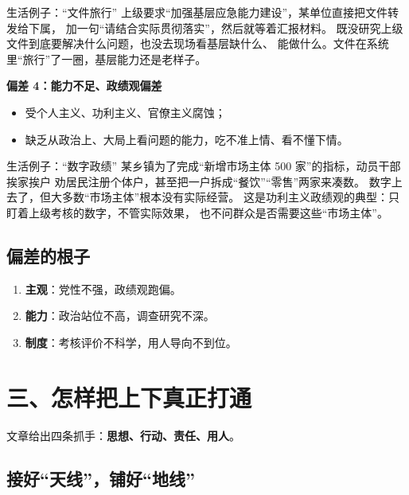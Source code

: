 \documentclass[11pt,a4paper]{ctexart}
\begin{document}
\begin{exampleblock}{生活例子：``文件旅行''}
上级要求``加强基层应急能力建设''，某单位直接把文件转发给下属，
加一句``请结合实际贯彻落实''，然后就等着汇报材料。
既没研究上级文件到底要解决什么问题，也没去现场看基层缺什么、
能做什么。文件在系统里``旅行''了一圈，基层能力还是老样子。
\end{exampleblock}

\begin{caseblock}{}
\textbf{偏差 4：能力不足、政绩观偏差}
\begin{itemize}
  \item 受个人主义、功利主义、官僚主义腐蚀；
  \item 缺乏从政治上、大局上看问题的能力，吃不准上情、看不懂下情。
\end{itemize}
\end{caseblock}

\begin{exampleblock}{生活例子：``数字政绩''}
某乡镇为了完成``新增市场主体 500 家''的指标，动员干部挨家挨户
劝居民注册个体户，甚至把一户拆成``餐饮''``零售''两家来凑数。
数字上去了，但大多数``市场主体''根本没有实际经营。
这是功利主义政绩观的典型：只盯着上级考核的数字，不管实际效果，
也不问群众是否需要这些``市场主体''。
\end{exampleblock}

\subsection*{偏差的根子}

\begin{enumerate}[label=\textbf{\arabic*.}]
  \item \textbf{主观}：党性不强，政绩观跑偏。
  \item \textbf{能力}：政治站位不高，调查研究不深。
  \item \textbf{制度}：考核评价不科学，用人导向不到位。
\end{enumerate}

\section{三、怎样把上下真正打通}

文章给出四条抓手：\textbf{思想、行动、责任、用人}。

\subsection{接好``天线''，铺好``地线''}
\end{document}

